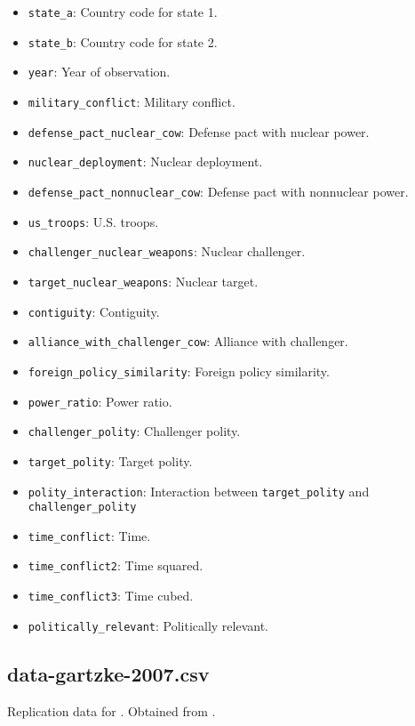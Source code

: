 \documentclass[12pt]{article}
\begin{document}
\begin{itemize}
  \item \texttt{state\_a}: Country code for state 1.
  \item \texttt{state\_b}: Country code for state 2.
  \item \texttt{year}: Year of observation.
  \item \texttt{military\_conflict}: Military conflict.
  \item \texttt{defense\_pact\_nuclear\_cow}: Defense pact with nuclear power.
  \item \texttt{nuclear\_deployment}: Nuclear deployment.
  \item \texttt{defense\_pact\_nonnuclear\_cow}: Defense pact with nonnuclear power.
  \item \texttt{us\_troops}: U.S. troops.
  \item \texttt{challenger\_nuclear\_weapons}: Nuclear challenger.
  \item \texttt{target\_nuclear\_weapons}: Nuclear target.
  \item \texttt{contiguity}: Contiguity.
  \item \texttt{alliance\_with\_challenger\_cow}: Alliance with challenger.
  \item \texttt{foreign\_policy\_similarity}: Foreign policy similarity.
  \item \texttt{power\_ratio}: Power ratio.
  \item \texttt{challenger\_polity}: Challenger polity.
  \item \texttt{target\_polity}: Target polity.
  \item \texttt{polity\_interaction}: Interaction between \texttt{target\_polity} and \texttt{challenger\_polity}
  \item \texttt{time\_conflict}: Time.
  \item \texttt{time\_conflict2}: Time squared.
  \item \texttt{time\_conflict3}: Time cubed.
  \item \texttt{politically\_relevant}: Politically relevant.
\end{itemize}

\subsection{data-gartzke-2007.csv}

Replication data for \citet{gartzke2007}.
Obtained from \citet{gartzke2007data}.
\end{document}
